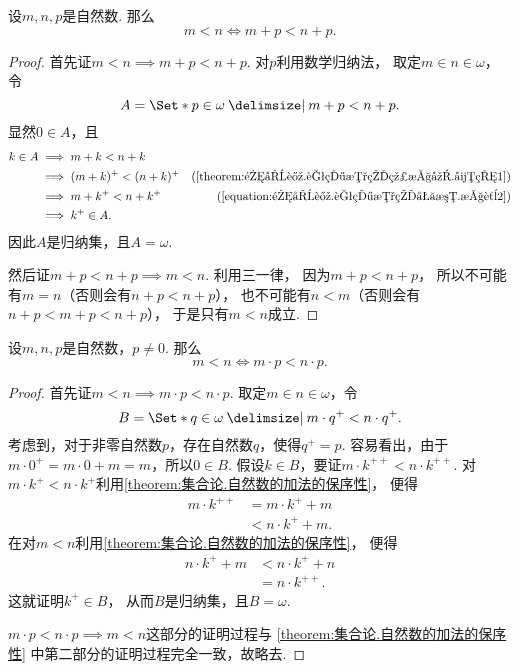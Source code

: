 \begin{theorem}\label{theorem:集合论.自然数的加法的保序性}
设\(m,n,p\)是自然数.
那么\[
	m < n \iff m + p < n + p.
\]
\begin{proof}
首先证\(m < n \implies m + p < n + p\).
对\(p\)利用数学归纳法，
取定\(m \in n \in \omega\)，
令\[
	A = \Set*{
		p \in \omega
		\given
		m + p < n + p
	}.
\]
显然\(0 \in A\)，且\begin{align*}
	k \in A
	&\implies m+k<n+k \\
	&\implies (m+k)^+<(n+k)^+
		&(\text{\cref{theorem:集合论.自然数的线性序.引理1}}) \\
	&\implies m+k^+<n+k^+
		&(\text{\cref{equation:集合论.自然数的加法.性质2}}) \\
	&\implies k^+ \in A.
\end{align*}
因此\(A\)是归纳集，且\(A = \omega\).

然后证\(m + p < n + p \implies m < n\).
利用三一律，
因为\(m + p < n + p\)，
所以不可能有\(m = n\)（否则会有\(n+p<n+p\)），
也不可能有\(n < m\)（否则会有\(n+p<m+p<n+p\)），
于是只有\(m < n\)成立.
\end{proof}
\end{theorem}

\begin{theorem}\label{theorem:集合论.自然数的乘法的保序性}
设\(m,n,p\)是自然数，\(p \neq 0\).
那么\[
	m < n \iff m \cdot p < n \cdot p.
\]
\begin{proof}
首先证\(m < n \implies m \cdot p < n \cdot p\).
取定\(m \in n \in \omega\)，令\[
	B = \Set*{
		q \in \omega
		\given
		m \cdot q^+ < n \cdot q^+
	}.
\]
考虑到，对于非零自然数\(p\)，存在自然数\(q\)，使得\(q^+ = p\).
容易看出，由于\(m \cdot 0^+ = m \cdot 0 + m = m\)，所以\(0 \in B\).
假设\(k \in B\)，要证\(m \cdot k^{++} < n \cdot k^{++}\).
对\(m \cdot k^+ < n \cdot k^+\)利用\cref{theorem:集合论.自然数的加法的保序性}，
便得\begin{align*}
	m \cdot k^{++}
	&= m \cdot k^+ + m \\
	&< n \cdot k^+ + m.
\end{align*}
在对\(m < n\)利用\cref{theorem:集合论.自然数的加法的保序性}，
便得\begin{align*}
	n \cdot k^+ + m
	&< n \cdot k^+ + n \\
	&= n \cdot k^{++}.
\end{align*}
这就证明\(k^+ \in B\)，
从而\(B\)是归纳集，且\(B = \omega\).

\(m \cdot p < n \cdot p \implies m < n\)这部分的证明过程与%
\cref{theorem:集合论.自然数的加法的保序性} 中第二部分的证明过程完全一致，故略去.
\end{proof}
\end{theorem}

